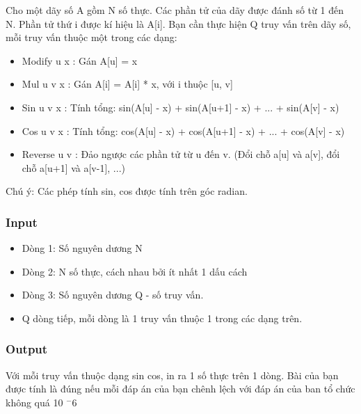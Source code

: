 



   Cho một dãy số A gồm N số thực. Các phần tử của dãy được đánh số từ 1 đến N. Phần tử thứ i được kí hiệu là A[i]. Bạn cần thực hiện Q truy vấn trên dãy số, mỗi truy vấn thuộc một trong các dạng:  
\begin{itemize}
	\item     Modify u x : Gán A[u] = x   
	\item     Mul u v x : Gán A[i] = A[i] * x, với i thuộc [u, v]   
	\item     Sin u v x : Tính tổng: sin(A[u] - x) + sin(A[u+1] - x) + ... + sin(A[v] - x)   
	\item     Cos u v x : Tính tổng: cos(A[u] - x) + cos(A[u+1] - x) + ... + cos(A[v] - x)   
	\item     Reverse u v : Đảo ngược các phần tử từ u đến v. (Đổi chỗ a[u] và a[v], đổi chỗ a[u+1] và a[v-1], ...)   
\end{itemize}

   Chú ý: Các phép tính sin, cos được tính trên góc radian.  

\subsubsection{   Input  }
\begin{itemize}
	\item     Dòng 1: Số nguyên dương N   
	\item     Dòng 2: N số thực, cách nhau bởi ít nhất 1 dấu cách   
	\item     Dòng 3: Số nguyên dương Q - số truy vấn.   
	\item     Q dòng tiếp, mỗi dòng là 1 truy vấn thuộc 1 trong các dạng trên.   
\end{itemize}

\subsubsection{   Output  }

   Với mỗi truy vấn thuộc dạng sin cos, in ra 1 số thực trên 1 dòng. Bài của bạn được tính là đúng nếu mỗi đáp án của bạn chênh lệch với đáp án của ban tổ chức không quá 10   $^    -6   $

